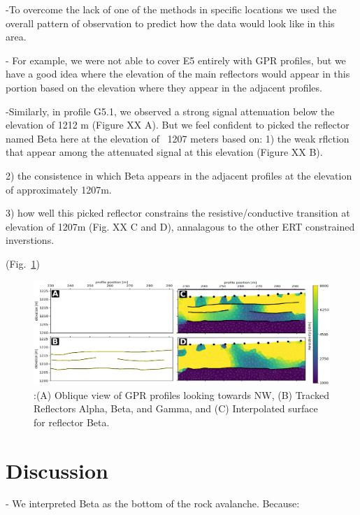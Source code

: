 \documentclass[5p]{elsarticle}
\begin{document}
-To overcome the lack of one of the methods in specific locations we used the overall pattern of observation to predict how the data would look like in this area. 

- For example, we were not able to cover E5 entirely with GPR profiles, but we have a good idea where the elevation of the main reflectors would appear in this portion based on the elevation where they appear in the adjacent profiles.

-Similarly, in profile G5.1, we observed a strong signal attenuation below the elevation of 1212 m (Figure XX A). But we feel confident to picked the reflector named Beta here at the elevation of ~1207 meters based on: 
1) the weak rflction that appear among the attenuated signal at this elevation (Figure XX B).

2) the consistence in which Beta appears in the adjacent profiles at the elevation of approximately 1207m.

3) how well this picked reflector constrains the resistive/conductive transition at elevation of 1207m (Fig. XX C and D), annalagous to the other ERT constrained inverstions. 
								   
				(Fig.~\ref{Combined_ABCD})			

                                \begin{figure}[h]

	\includegraphics[width=\textwidth]{Figures/Combined_ABCD.pdf}
		\caption{:(A) Oblique view of GPR profiles looking towards NW, (B) Tracked Reflectors Alpha, Beta, and Gamma, and (C) Interpolated surface for reflector Beta. \label{Combined_ABCD}}

								   \end{figure}





\section{Discussion}

- We interpreted Beta as the bottom of the rock avalanche. Because: 
\end{document}
